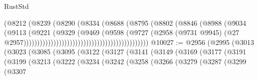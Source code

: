 \begin{lexlean}{RustStd}
\begin{coremodule}
                                                            (@8212
                                                              (@8239
                                                                (@8290
                                                                  (@8334
                                                                    (@8688
                                                                      (@8795
                                                                        (@8802
                                                                          (@8846
                                                                            (@8988
                                                                              (@9034
                                                                                (@9113
                                                                                  (@9221
                                                                                    (@9329
                                                                                      (@9469
                                                                                        (@9598
                                                                                          (@9727
                                                                                            (@2958
                                                                                              (@9731
                                                                                                @9945)
                                                                                              (@27
                                                                                                @2957))))))))))))))))))))))))))))))))))))))))))))))
@10027 := @2956
    (@2995
      (@3013
        (@3023
          (@3085
            (@3095
              (@3122
                (@3127
                  (@3141
                    (@3149
                      (@3169
                        (@3177
                          (@3191
                            (@3199
                              (@3213
                                (@3222
                                  (@3234
                                    (@3242
                                      (@3258
                                        (@3266
                                          (@3279
                                            (@3287
                                              (@3299
                                                (@3307

\end{coremodule}
\end{lexlean}
